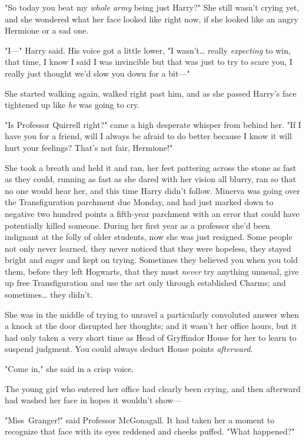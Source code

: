 "So today you beat my \emph{whole army} being just Harry?" She still wasn't
crying yet, and she wondered what her face looked like right now, if she looked
like an angry Hermione or a sad one.

"I---" Harry said. His voice got a little lower, "I wasn't{\ldots} really
\emph{expecting} to win, that time, I know I said I was invincible but that was
just to try to scare you, I really just thought we'd slow you down for a bit---"

She started walking again, walked right past him, and as she passed Harry's
face tightened up like \emph{he} was going to cry.

"Is Professor Quirrell right?" came a high desperate whisper from behind her.
"If I have you for a friend, will I always be afraid to do better because I
know it will hurt your feelings? That's not fair, Hermione!"

She took a breath and held it and ran, her feet pattering across the stone as
fast as they could, running as fast as she dared with her vision all blurry,
ran so that no one would hear her, and this time Harry didn't follow.
\later
Minerva was going over the Transfiguration parchment due Monday, and had just
marked down to negative two hundred points a fifth-year parchment with an error
that could have potentially killed someone. During her first year as a
professor she'd been indignant at the folly of older students, now she was just
resigned. Some people not only never learned, they never noticed that they were
hopeless, they stayed bright and eager and kept on trying. Sometimes they
believed you when you told them, before they left Hogwarts, that they must
\emph{never} try anything unusual, give up free Transfiguration and use the art
only through established Charms; and sometimes{\ldots} they didn't.

She was in the middle of trying to unravel a particularly convoluted answer
when a knock at the door disrupted her thoughts; and it wasn't her office
hours, but it had only taken a very short time as Head of Gryffindor House for
her to learn to suspend judgment. You could always deduct House points
\emph{afterward.}

"Come in," she said in a crisp voice.

The young girl who entered her office had clearly been crying, and then
afterward had washed her face in hopes it wouldn't show---

"Miss~Granger!" said Professor McGonagall. It had taken her a moment to
recognize that face with its eyes reddened and cheeks puffed. "What happened?"


